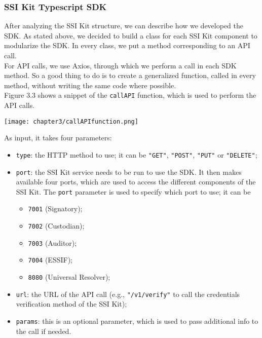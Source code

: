 \subsubsection{SSI Kit Typescript SDK}
After analyzing the SSI Kit structure, we can describe how we developed the SDK.
As stated above, we decided to build a class for each SSI Kit component to modularize 
the SDK. In every class, we put a method corresponding to an API call.\\
For API calls, we use Axios, through which we perform a call in each SDK method. So 
a good thing to do is to create a generalized function, called in every method, 
without writing the same code where possible.
\vspace{0.3cm}\\
Figure 3.3 shows a snippet of the \texttt{callAPI} function, which is used to perform
the API calls.
\begin{center}
    \texttt{[image: chapter3/callAPIfunction.png]}
    \vspace{-0.5cm}
    \label{fig:callAPI}
\end{center}
\vspace{0.5cm}
As input, it takes four parameters:
\begin{itemize}
    \item \texttt{type}: the HTTP method to use; it can be \texttt{"GET"}, \texttt{"POST"},
    \texttt{"PUT"} or \texttt{"DELETE"};
    \item \texttt{port}: the SSI Kit service needs to be run to use the SDK. It then makes
    available four ports, which are used to access the different components of the
    SSI Kit. The \texttt{port} parameter is used to specify which port to use; it can
    be 
    \begin{itemize}
        \item \texttt{7001} (Signatory);
        \item \texttt{7002} (Custodian);
        \item \texttt{7003} (Auditor);
        \item \texttt{7004} (ESSIF);
        \item \texttt{8080} (Universal Resolver);
    \end{itemize}
    \item \texttt{url}: the URL of the API call (e.g., \texttt{"/v1/verify"} to call
    the credentials verification method of the SSI Kit);
    \item \texttt{params}: this is an optional parameter, which is used to pass
    additional info to the call if needed.
\end{itemize}
